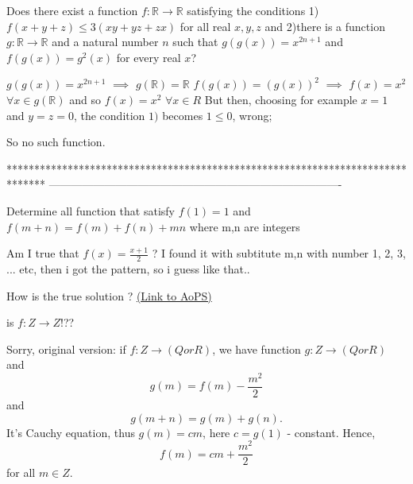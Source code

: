 \begin{solution}
	\begin{tcolorbox}Does there exist a function $f: \mathbb{R}\to\mathbb{R}$ satisfying the conditions
1)$ f(x+y+z){\leq}3(xy+yz+zx)$ for all real $x,y,z$ and 2)there is a function $g: \mathbb{R}\to\mathbb{R}$ and a natural number $n$
such that $g(g(x))=x^{2n+1}$ and $f(g(x))=g^2(x)$ for every real $x$?\end{tcolorbox}
$g(g(x))=x^{2n+1}$ $\implies$ $g(\mathbb R)=\mathbb R$
$f(g(x))=(g(x))^2$ $\implies$ $f(x)=x^2$ $\forall x\in g(\mathbb R)$ and so $f(x)=x^2$ $\forall x\in R$
But then, choosing for example $x=1$ and $y=z=0$, the condition $1)$ becomes $1\le 0$, wrong;

So no such function.
\end{solution}
*******************************************************************************
-------------------------------------------------------------------------------

\begin{problem}
	Determine all function that satisfy $ f(1) = 1 $ and $ f(m+n) = f(m) + f(n) + mn $ where m,n are integers

Am I true that $ f(x) = \frac{x+1}{2} $ ? 
I found it with subtitute m,n with number 1, 2, 3, ... etc, then i got the pattern, so i guess like that..

How is the true solution ?
	\flushright \href{https://artofproblemsolving.com/community/c6h534875}{(Link to AoPS)}
\end{problem}



\begin{solution}
	is $f:Z\rightarrow Z$!??
\end{solution}



\begin{solution}
	Sorry, original version:
if  $f:Z\rightarrow (Q or R)$,  we have  function  $g:Z\rightarrow  (Q or R) $  and \[ g(m)=f(m)-\frac{m^2}{2} \] and \[ g(m+n)=g(m)+g(n) .\]
It's Cauchy equation, thus  $g(m)=cm$, here $c=g(1)$ - constant.  
Hence, \[ f(m)=cm+\frac{m^2}{2} \] for all  $m\in Z.$
\end{solution}



